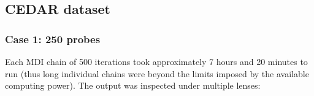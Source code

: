 \documentclass[12pt]{article} %
\begin{document}

	\subsection{CEDAR dataset} \label{sec:results:cedar}
	\subsubsection{Case 1: 250 probes} \label{sec:results:cedar:dataset_1}
	
	Each MDI chain of 500 iterations took approximately 7 hours and 20 minutes to run (thus long individual chains were beyond the limits imposed by the available computing power). The output was inspected under multiple lenses: 
	
\end{document}
